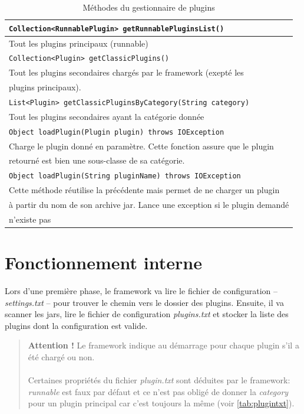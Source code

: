 \documentclass[12pt,a4paper]{article}
\begin{document}
\begin{table}[h]
	\begin{tabular}{|l|}

		\hline
		\texttt{Collection<RunnablePlugin> getRunnablePluginsList()}\\
		\hline
		Tout les plugins principaux (runnable)\\
		\hline

		\hline
		\texttt{Collection<Plugin> getClassicPlugins()}\\
		\hline
		Tout les plugins secondaires chargés par le framework (exepté les \\
		plugins	principaux).\\
		\hline
			
		\hline
		\texttt{List<Plugin> getClassicPluginsByCategory(String category)}\\
		\hline
		Tout les plugins secondaires ayant la catégorie donnée\\
		\hline			
			
		\hline
		\texttt{Object loadPlugin(Plugin plugin) throws IOException}\\
		\hline
		Charge le plugin donné en paramètre. Cette fonction assure que le plugin\\
		retourné est bien une sous-classe de sa catégorie.\\
		\hline
		
		\hline
		\texttt{Object loadPlugin(String pluginName) throws IOException}\\
		\hline
		Cette méthode réutilise la précédente mais permet de ne charger un plugin\\
		à partir du nom de son archive jar. Lance une exception si le plugin demandé\\
		n'existe pas\\
		\hline		
	\end{tabular}	
\caption{Méthodes du gestionnaire de plugins}
\end{table}

\section{Fonctionnement interne}
Lors d'une première phase, le framework va lire le fichier de configuration -- 
\emph{settings.txt} -- pour trouver le chemin vers le dossier des plugins. 
Ensuite, il va scanner les jars, lire le fichier de configuration 
\emph{plugins.txt} et stocker la liste des plugins dont la configuration est valide.

\begin{quote}
	\textbf{Attention !} Le framework indique au démarrage pour chaque plugin 
	s'il a été chargé ou non. 
	\\\\
	Certaines propriétés du fichier \emph{plugin.txt} sont déduites par le 
	framework: \emph{runnable} est faux par défaut et ce n'est pas obligé de 
	donner la \emph{category} pour un plugin principal car c'est toujours la 
	même (voir \ref{tab:plugintxt}).
\end{quote}
\end{document}
